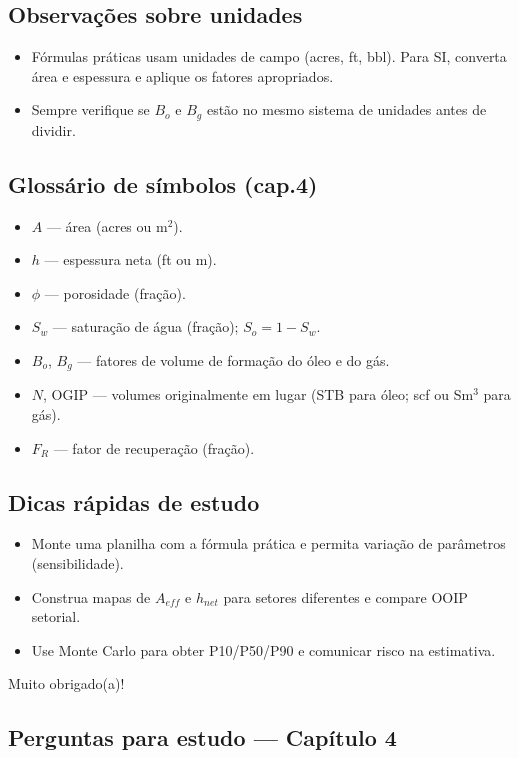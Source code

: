 \documentclass[11pt,a4paper]{article}
\begin{document}
\subsection{Observações sobre unidades}
\begin{itemize}
\item Fórmulas práticas usam unidades de campo (acres, ft, bbl). Para SI, converta área e espessura e aplique os fatores apropriados.
\item Sempre verifique se $B_o$ e $B_g$ estão no mesmo sistema de unidades antes de dividir.
\end{itemize}

\subsection{Glossário de símbolos (cap.4)}
\begin{itemize}
\item $A$ — área (acres ou m$^2$).
\item $h$ — espessura neta (ft ou m).
\item $\phi$ — porosidade (fração).
\item $S_w$ — saturação de água (fração); $S_o = 1-S_w$.
\item $B_o$, $B_g$ — fatores de volume de formação do óleo e do gás.
\item $N$, OGIP — volumes originalmente em lugar (STB para óleo; scf ou Sm$^3$ para gás).
\item $F_R$ — fator de recuperação (fração).
\end{itemize}

\subsection{Dicas rápidas de estudo}
\begin{itemize}
\item Monte uma planilha com a fórmula prática e permita variação de parâmetros (sensibilidade).
\item Construa mapas de $A_{eff}$ e $h_{net}$ para setores diferentes e compare OOIP setorial.
\item Use Monte Carlo para obter P10/P50/P90 e comunicar risco na estimativa.
\end{itemize}


Muito obrigado(a)!

\subsection*{Perguntas para estudo --- Capítulo 4}
\end{document}
